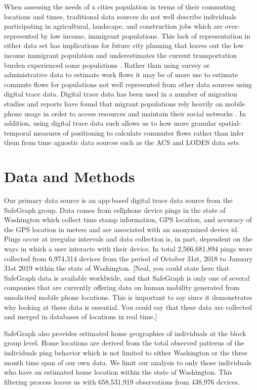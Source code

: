 \documentclass[fleqn,10pt]{olplainarticle}
\begin{document}
When assessing the needs of a cities population in terms of their commuting locations and times, traditional data sources do not well describe individuals participating in agricultural, landscape, and construction jobs which are over-represented by low income, immigrant populations. This lack of representation in either data set has implications for future city planning that leaves out the low income immigrant population and underestimates the current transportation burden experienced some populations \citep{Choi2013}. Rather than using survey or administrative data to estimate work flows it may be of more use to estimate commute flows for populations not well represented from other data sources using digital trace data. Digital trace data has been used in a number of migration studies \citep{Hughes2016} and reports have found that migrant populations rely heavily on mobile phone usage in order to access resources and maintain their social networks \citep{Maitland2018}. In addition, using digital trace data such allows us to how more granular spatial-temporal measures of positioning to calculate commuter flows rather than infer them from time agnostic data sources such as the ACS and LODES data sets.

\section*{Data and Methods}

Our primary data source is an app-based digital trace data source from the SafeGraph group. Data comes from cellphone device pings in the state of Washington which collect time stamp information, GPS location, and accuracy of the GPS location in meters and are associated with an anonymized device id. Pings occur at irregular intervals and data collection is, in part, dependent on the ways in which a user interacts with their device. In total 2,566,681,894 pings were collected from 6,974,314 devices from the period of October 31st, 2018 to January 31st 2019 within the state of Washington. [Neal, you could state here that SafeGraph data is available worldwide, and that SafeGraph is only one of several companies that are currently offering data on human mobility generated from unsolicited mobile phone locations. This is important to say since it demonstrates why looking at these data is essential. You could say that these data are collected and merged in databases of locations in real time.]

SafeGraph also provides estimated home geographies of individuals at the block group level. Home locations are derived from the total observed patterns of the individuals ping behavior which is not limited to either Washington or the three month time span of our own data. We limit our analysis to only those individuals who have an estimated home location within the state of Washington. This filtering process leaves us with 658,531,919 observations from 438,976 devices.
\end{document}
